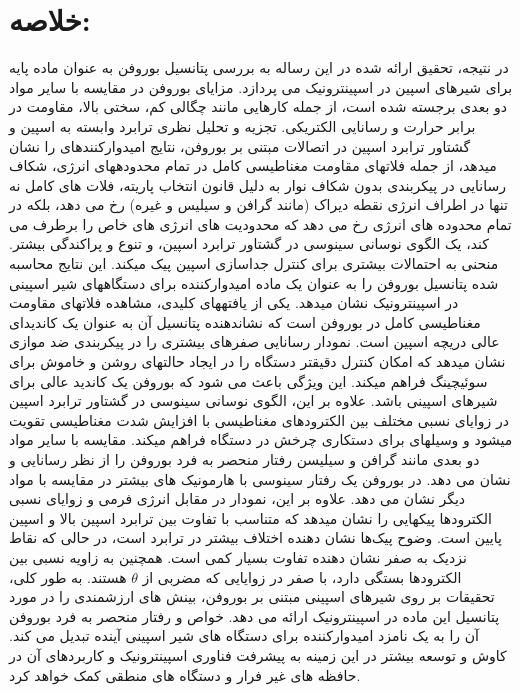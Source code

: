 \section{خلاصه:} 
در نتیجه، تحقیق ارائه شده در این رساله به بررسی پتانسیل بوروفن به عنوان ماده پایه برای شیرهای اسپین در اسپینترونیک می پردازد. مزایای بوروفن در مقایسه با سایر مواد دو بعدی برجسته شده است، از جمله کارهایی مانند چگالی کم، سختی بالا، مقاومت در برابر حرارت و رسانایی الکتریکی. تجزیه و تحلیل نظری ترابرد وابسته به اسپین و گشتاور ترابرد اسپین در اتصالات  مبتنی بر بوروفن، نتایج امیدوارکنندهای را نشان میدهد، از جمله فلاتهای مقاومت مغناطیسی کامل در تمام محدودههای انرژی، شکاف رسانایی در پیکربندی  بدون شکاف نوار به دلیل قانون انتخاب پاریته، فلات های کامل  نه تنها در اطراف انرژی نقطه دیراک (مانند گرافن و سیلیس و غیره) رخ می دهد، بلکه در تمام محدوده های انرژی رخ می دهد که محدودیت های انرژی های خاص را برطرف می کند، یک الگوی نوسانی سینوسی در گشتاور ترابرد اسپین، و تنوع و پراکندگی بیشتر. منحنی  به احتمالات بیشتری برای کنترل جداسازی اسپین پیک میکند. این نتایج محاسبه شده پتانسیل بوروفن را به عنوان یک ماده امیدوارکننده برای دستگاههای شیر اسپینی در اسپینترونیک نشان میدهد. یکی از یافتههای کلیدی، مشاهده فلاتهای مقاومت مغناطیسی کامل در بوروفن است که نشاندهنده پتانسیل آن به عنوان یک کاندیدای عالی دریچه اسپین است. نمودار رسانایی صفرهای بیشتری را در پیکربندی ضد موازی نشان میدهد که امکان کنترل دقیقتر دستگاه را در ایجاد حالتهای روشن و خاموش برای سوئیچینگ فراهم میکند. این ویژگی باعث می شود که بوروفن یک کاندید عالی برای شیرهای اسپینی باشد. علاوه بر این، الگوی نوسانی سینوسی در گشتاور ترابرد اسپین  در زوایای نسبی مختلف بین الکترودهای مغناطیسی با افزایش شدت مغناطیسی تقویت میشود و وسیلهای برای دستکاری چرخش در دستگاه فراهم میکند. مقایسه با سایر مواد دو بعدی مانند گرافن و سیلیسن رفتار منحصر به فرد بوروفن را از نظر رسانایی و  نشان می دهد.  در بوروفن یک رفتار سینوسی با هارمونیک های بیشتر در مقایسه با مواد دیگر نشان می دهد. علاوه بر این، نمودار  در مقابل انرژی فرمی و زوایای نسبی الکترودها پیکهایی را نشان میدهد که متناسب با تفاوت بین ترابرد اسپین بالا و اسپین پایین است. وضوح پیک‌ها نشان دهنده اختلاف بیشتر در ترابرد است، در حالی که نقاط نزدیک به صفر  نشان دهنده تفاوت بسیار کمی است.  همچنین به زاویه نسبی بین الکترودها بستگی دارد، با صفر  در زوایایی که مضربی از $\theta$ هستند. به طور کلی، تحقیقات بر روی شیرهای اسپینی مبتنی بر بوروفن، بینش های ارزشمندی را در مورد پتانسیل این ماده در اسپینترونیک ارائه می دهد. خواص و رفتار منحصر به فرد بوروفن آن را به یک نامزد امیدوارکننده برای دستگاه های شیر اسپینی آینده تبدیل می کند. کاوش و توسعه بیشتر در این زمینه به پیشرفت فناوری اسپینترونیک و کاربردهای آن در حافظه های غیر فرار و دستگاه های منطقی کمک خواهد کرد.


